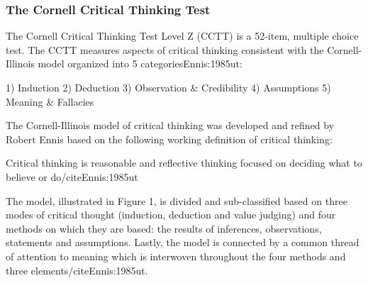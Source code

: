 \subsubsection{The Cornell Critical Thinking Test}

The Cornell Critical Thinking Test Level Z (CCTT) is a 52-item, multiple choice test. The CCTT measures aspects of critical thinking consistent with the Cornell-Illinois model organized into 5 categories{Ennis:1985ut}:

1)	Induction
2)	Deduction
3)	Observation & Credibility
4)	Assumptions
5)	Meaning & Fallacies

The Cornell-Illinois model of critical thinking was developed and refined by Robert Ennis based on the following working definition of critical thinking:

Critical thinking is reasonable and reflective thinking focused on deciding what to believe or do/cite{Ennis:1985ut}

The model, illustrated in Figure 1, is divided and sub-classified based on three modes of critical thought (induction, deduction and value judging) and four methods on which they are based: the results of inferences, observations, statements and assumptions. Lastly, the model is connected by a common thread of attention to meaning which is interwoven throughout the four methods and three elements/cite{Ennis:1985ut}. 

